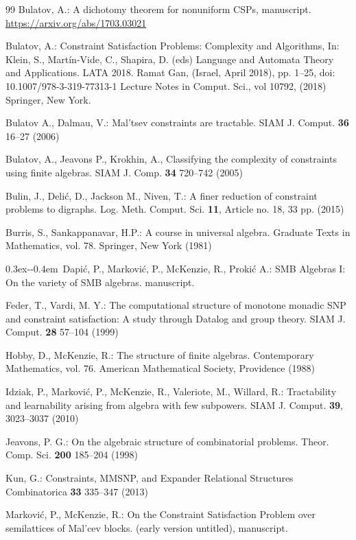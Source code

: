\documentclass[11pt]{amsart}
\def\Dj{\mbox{\raise0.3ex\hbox{-}\kern-0.4em D}}
\theoremstyle{definition}
\begin{document}
\begin{thebibliography}{99}
	Bulatov, A.:
	A dichotomy theorem for nonuniform CSPs, manuscript.
	\url{https://arxiv.org/abs/1703.03021}

	Bulatov, A.:
	Constraint Satisfaction Problems: Complexity and Algorithms, 
	In: Klein, S., Martín-Vide, C., Shapira, D. (eds) 
	Language and Automata Theory and Applications. LATA 2018. 
	Ramat Gan, (Israel, April 2018),	
	pp. 1--25, doi: 10.1007/978-3-319-77313-1
	Lecture Notes in Comput. Sci., 
	vol 10792, (2018)
	Springer, New York.

	Bulatov A., Dalmau, V.:
	Mal'tsev constraints are tractable.
	SIAM J. Comput.
	{\bf 36}
	16--27
	(2006)

	Bulatov, A., Jeavons P., Krokhin, A.,
	Classifying the complexity of constraints using finite algebras.
	SIAM J. Comp.
	{\bf 34}
	720--742
	(2005)

	Bulin, J., Deli\'c, D., Jackson M., Niven, T.:
	A finer reduction of constraint problems to digraphs.
	Log. Meth. Comput. Sci.
	{\bf 11}, 
	Article no. 18,
	33 pp.
	(2015)

	Burris, S., Sankappanavar, H.P.:
	A course in universal algebra.
	Graduate Texts in Mathematics, vol. 78.
	Springer,
	New York
	(1981)

	\Dj api\'{c}, P., Markovi\'{c}, P., McKenzie, R., Proki\'{c} A.:
	SMB Algebras I: On the variety of SMB algebras.
	manuscript.

	Feder, T., Vardi, M. Y.:
	The computational structure of monotone monadic SNP and constraint satisfaction: A study through Datalog and group theory. 
	SIAM J. Comput.
	{\bf 28}
	57--104 (1999)

	Hobby, D., McKenzie, R.:
	The structure of finite algebras.
	Contemporary Mathematics, vol. 76.
	American Mathematical Society, Providence (1988)

 	Idziak, P., Markovi\'{c}, P., McKenzie, R., Valeriote, M., Willard, R.:
	Tractability and learnability arising from algebra with few subpowers. 
	SIAM J. Comput.
	{\bf 39}, 
	3023--3037 (2010)

	Jeavons, P. G.:
	On the algebraic structure of combinatorial problems.
	Theor. Comp. Sci. {\bf 200}
	185--204
	(1998)

	Kun, G.:
	Constraints, {MMSNP}, and Expander Relational Structures
	Combinatorica
	{\bf 33}
	335--347
	(2013)

	Markovi\'{c}, P., McKenzie, R.:
	On the Constraint Satisfaction Problem over semilattices of Mal'cev blocks.
	(early version untitled),
	manuscript.


\end{thebibliography}
\end{document}
